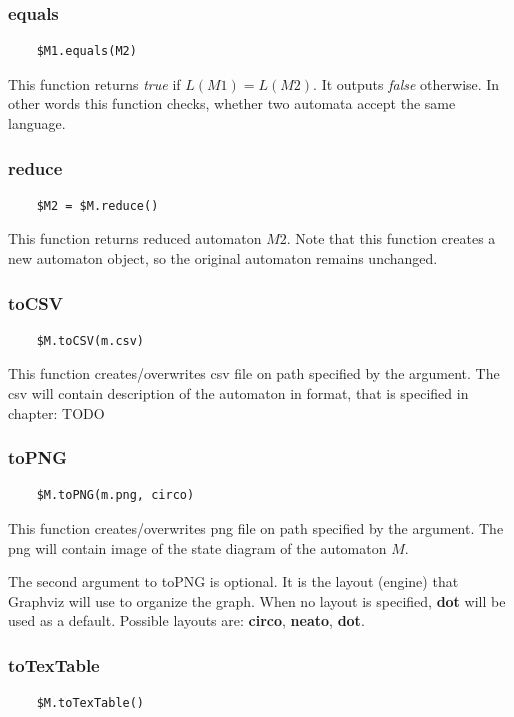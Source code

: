 \documentclass{ctuthesis}
\begin{document}
\subsubsection{equals}
\begin{verbatim}
	$M1.equals(M2)
\end{verbatim}

This function returns \textit{true} if $L(M1) = L(M2)$. It outputs \textit{false} otherwise. In other words this function checks, whether two automata accept the same language. 

\subsubsection{reduce}
\begin{verbatim}
	$M2 = $M.reduce()
\end{verbatim}

This function returns reduced automaton $M2$. Note that this function creates a new automaton object, so the original automaton remains unchanged.

\subsubsection{toCSV}
\begin{verbatim}
	$M.toCSV(m.csv)
\end{verbatim}

This function creates/overwrites csv file on path specified by the argument. The csv will contain description of the automaton in format, that is specified in chapter: TODO

\subsubsection{toPNG}
\begin{verbatim}
	$M.toPNG(m.png, circo)
\end{verbatim}

This function creates/overwrites png file on path specified by the argument. The png will contain image of the state diagram of the automaton $M$. 

The second argument to toPNG is optional. It is the layout (engine) that Graphviz will use to organize the graph. When no layout is specified, \textbf{dot} will be used as a default. Possible layouts are: \textbf{circo}, \textbf{neato}, \textbf{dot}.

\subsubsection{toTexTable}
\begin{verbatim}
	$M.toTexTable()
\end{verbatim}
\end{document}
